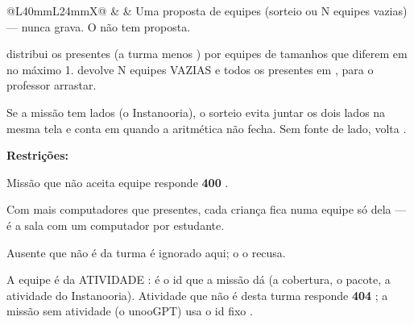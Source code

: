 \begin{tabularx}{\linewidth}{@{}L{40mm}L{24mm}X@{}}
 &  & Uma proposta de equipes (sorteio ou N equipes vazias) --- nunca grava. O  não tem proposta.\par {} distribui os presentes (a turma menos ) por  equipes de tamanhos que diferem em no máximo 1.  devolve N equipes VAZIAS e todos os presentes em , para o professor arrastar.\par Se a missão tem lados (o Instanooria), o sorteio evita juntar os dois lados na mesma tela e conta em  quando a aritmética não fecha. Sem fonte de lado,  volta .\par \textbf{Restrições:}\par \hspace*{1em}\textbullet{} Missão que não aceita equipe responde \textbf{400} .\par \hspace*{1em}\textbullet{} Com mais computadores que presentes, cada criança fica numa equipe só dela --- é a sala com um computador por estudante.\par \hspace*{1em}\textbullet{} Ausente que não é da turma é ignorado aqui; o  o recusa.\par \hspace*{1em}\textbullet{} A equipe é da ATIVIDADE :  é o id que a missão dá (a cobertura, o pacote, a atividade do Instanooria). Atividade que não é desta turma responde \textbf{404} ; a missão sem atividade (o unooGPT) usa o id fixo .\\

\end{tabularx}
